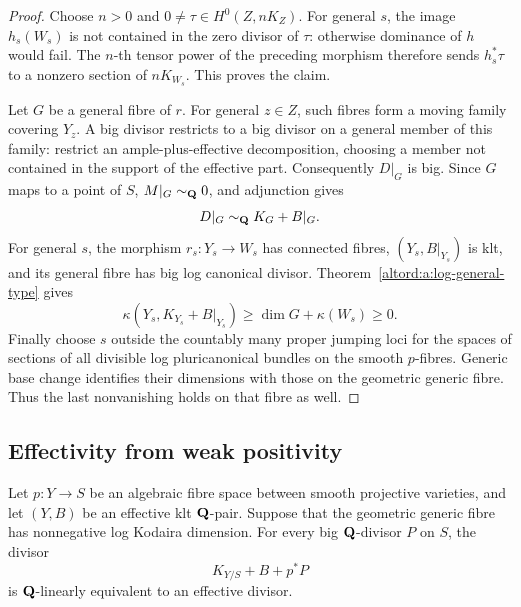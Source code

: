 \begin{proof}
Choose \(n>0\) and \(0\ne\tau\in H^0(Z,nK_Z)\).
For general \(s\), the image \(h_s(W_s)\) is not contained in the
zero divisor of \(\tau\): otherwise dominance of \(h\) would fail.
The \(n\)-th tensor power of the preceding morphism therefore sends
\(h_s^*\tau\) to a nonzero section of \(nK_{W_s}\).  This proves the
claim.

Let \(G\) be a general fibre of \(r\).  For general \(z\in Z\), such
fibres form a moving family covering \(Y_z\).  A big divisor
restricts to a big divisor on a general member of this family:
restrict an ample-plus-effective decomposition, choosing a member
not contained in the support of the effective part.  Consequently
\(D|_G\) is big.  Since \(G\) maps to a point of \(S\),
\(M|_G\sim_{\mathbf Q}0\), and adjunction gives
\[
 D|_G\sim_{\mathbf Q}K_G+B|_G.
\]
For general \(s\), the morphism \(r_s:Y_s\to W_s\) has connected
fibres, \((Y_s,B|_{Y_s})\) is klt, and its general fibre has big log
canonical divisor.  Theorem~\ref{altord:a:log-general-type} gives
\[
 \kappa(Y_s,K_{Y_s}+B|_{Y_s})\geq
 \dim G+\kappa(W_s)\geq0.
\]
Finally choose \(s\) outside the countably many proper jumping
loci for the spaces of sections of all divisible log
pluricanonical bundles on the smooth \(p\)-fibres.  Generic base
change identifies their dimensions with those on the geometric
generic fibre.  Thus the last nonvanishing holds on that fibre as
well.
\end{proof}

\subsection{Effectivity from weak positivity}

\begin{lemma}\label{altord:a:effectivity}
Let \(p:Y\to S\) be an algebraic fibre space between smooth
projective varieties, and let \((Y,B)\) be an effective klt
\(\mathbf Q\)-pair.  Suppose that the geometric generic fibre has
nonnegative log Kodaira dimension.  For every big \(\mathbf Q\)-divisor
\(P\) on \(S\), the divisor
\[
 K_{Y/S}+B+p^*P
\]
is \(\mathbf Q\)-linearly equivalent to an effective divisor.
\end{lemma}

